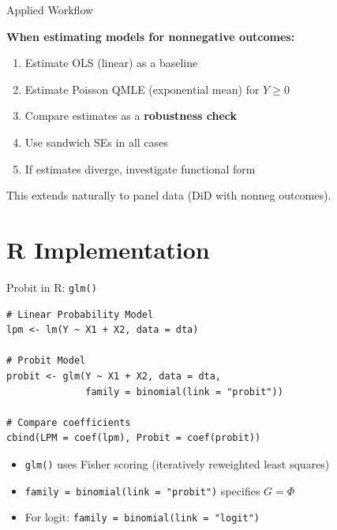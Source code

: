 \documentclass[aspectratio=169, handout, t]{beamer}
\numberwithin{equation}{section}
\begin{document}

\begin{frame}{Applied Workflow}

\textbf{When estimating models for nonnegative outcomes:}

\bigskip

\begin{enumerate}
    \item Estimate OLS (linear) as a baseline
    \item Estimate Poisson QMLE (exponential mean) for $Y \geq 0$
    \item Compare estimates as a \textbf{robustness check}
    \item Use sandwich SEs in all cases
    \item If estimates diverge, investigate functional form
\end{enumerate}

\pause

\bigskip

This extends naturally to panel data (DiD with nonneg outcomes).

\end{frame}

\section{R Implementation}

\begin{frame}[fragile]{Probit in R: \texttt{glm()}}

\begin{lstlisting}
# Linear Probability Model
lpm <- lm(Y ~ X1 + X2, data = dta)

# Probit Model
probit <- glm(Y ~ X1 + X2, data = dta,
              family = binomial(link = "probit"))

# Compare coefficients
cbind(LPM = coef(lpm), Probit = coef(probit))
\end{lstlisting}

\pause

\bigskip

\begin{itemize}
    \item \texttt{glm()} uses Fisher scoring (iteratively reweighted least squares)
    \item \texttt{family = binomial(link = "probit")} specifies $G = \Phi$
    \item For logit: \texttt{family = binomial(link = "logit")}
\end{itemize}

\end{frame}
\end{document}
